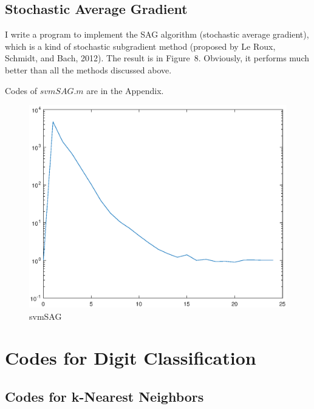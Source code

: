 \documentclass{article}
\begin{document}
\subsection{Stochastic Average Gradient}
I write a program to implement the SAG algorithm (stochastic average gradient), which is a kind of stochastic subgradient method (proposed by Le Roux, Schmidt, and Bach, 2012).  The result is in Figure~8. Obviously, it performs much better than all the methods discussed above.
 
Codes of $svmSAG.m$ are in the Appendix.
\begin{figure}
\centering
\includegraphics[scale=0.4]{8.eps}
\caption{svmSAG}
\end{figure}

\appendix
\section{Codes for Digit Classification}
\subsection{Codes for k-Nearest Neighbors}
\end{document}
